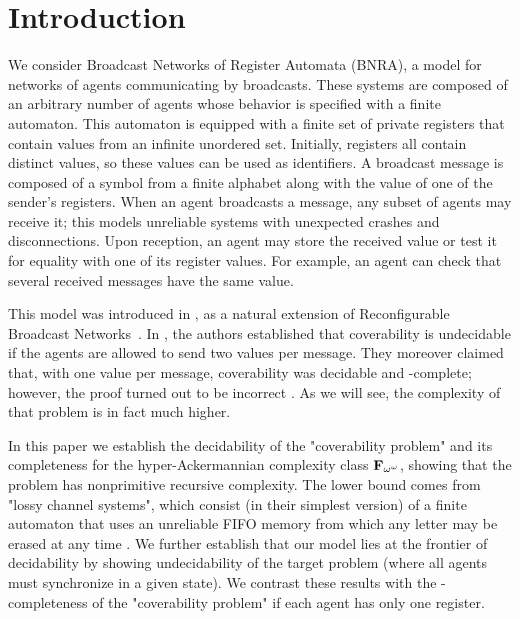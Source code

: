 \section{Introduction}
We consider Broadcast Networks of Register Automata (BNRA), a model for networks of agents communicating by broadcasts. These systems are composed of an arbitrary number of agents whose behavior is specified with a finite automaton. This automaton is equipped with a finite set of private registers that contain values from an infinite unordered set. Initially, registers all contain distinct values, so these values can be used as identifiers. 
A broadcast message is composed of a symbol from a finite alphabet along with the value of one of the sender's registers. When an agent broadcasts a message, any subset of agents may receive it; this models unreliable systems with unexpected crashes and disconnections. Upon reception, an agent may store the received value or test it for equality with one of its register values. For example, an agent can check that several received messages have the same value.

This model was introduced in \cite{DelzannoST13}, as a natural extension of Reconfigurable Broadcast Networks~\cite{DelzannoSZ2010Adhoc}. In \cite{DelzannoST13}, the authors established that coverability is undecidable if the agents are allowed to send two values per message. They moreover claimed that, with one value per message, coverability was decidable and \PSPACE-complete; however, the proof turned out to be incorrect \cite{ArnaudErratum}. As we will see, the complexity of that problem is in fact much higher. 

In this paper we establish the decidability of the "coverability problem" and its completeness for the hyper-Ackermannian complexity class $\mathbf{F}_{\omega^\omega}$, showing that the problem has nonprimitive recursive complexity. The lower bound comes from "lossy channel systems", which consist (in their simplest version) of a finite automaton that uses an unreliable FIFO memory from which any letter may be erased at any time \cite{AbdullaJ1996verif, Schnoebelen2002verifying,ChambartS08ordinal}. 
We further establish that our model lies at the frontier of decidability by showing undecidability of the target problem (where all agents must synchronize in a given state). We contrast these results with the \NP-completeness of the "coverability problem" if each agent has only one register. 

